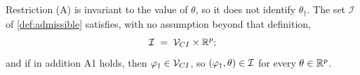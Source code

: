 %
%


\begin{lemma}\label{lem:shiftinv}
Restriction (A) is invariant to the value of $\theta$, so it does not identify $\theta_\dagger$.
The set $\mathcal I$ of \cref{def:admissible} satisfies, with no assumption beyond that definition,
\begin{equation}\label{eq:shiftinv}
\mathcal I\;=\;\mathcal V_{CI}\times\mathbb{R}^{p};
\end{equation}
and if in addition A1 holds, then $\varphi_{\dagger}\in\mathcal V_{CI}$, so $(\varphi_{\dagger},\theta)\in\mathcal I$ for
every $\theta\in\mathbb{R}^{p}$.
\end{lemma}


